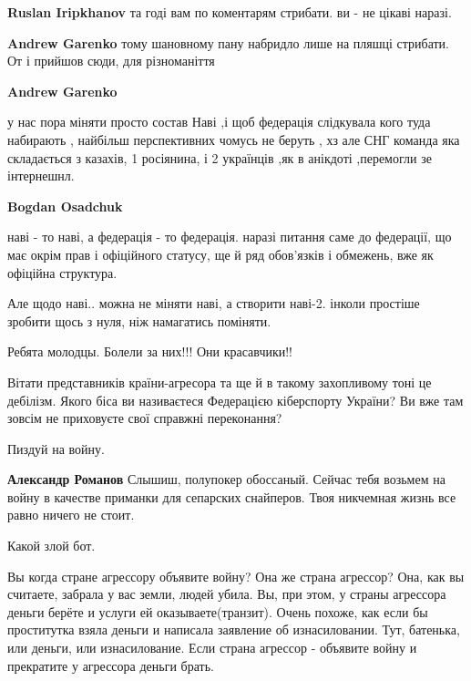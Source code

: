 \begin{itemize}
\begin{itemize}
\begin{itemize} %
\textbf{Ruslan Iripkhanov} та годі вам по коментарям стрибати. ви - не цікаві наразі.

\textbf{Andrew Garenko} тому шановному пану набридло лише на пляшці стрибати. От і прийшов сюди, для різноманіття
\end{itemize} %

\textbf{Andrew Garenko}

у нас пора міняти просто состав Наві ,і щоб федерація слідкувала кого туда
набирають , найбільш перспективних чомусь не беруть , хз але СНГ команда яка
складається з казахів, 1 росіянина, і 2 українців ,як в анікдоті ,перемогли зе
інтернешнл.

\begin{itemize} %
\textbf{Bogdan Osadchuk} 

наві - то наві, а федерація - то федерація. наразі питання саме до федерації,
що має окрім прав і офіційного статусу, ще й ряд обов'язків і обмежень, вже як
офіційна структура.

Але щодо наві.. можна не міняти наві, а створити наві-2. інколи простіше
зробити щось з нуля, ніж намагатись поміняти.

\end{itemize} %

\end{itemize} %

Ребята молодцы. Болели за них!!! Они красавчики!!


Вітати представників країни-агресора та ще й в такому захопливому тоні це
дебілізм. Якого біса ви називаєтеся Федерацією кіберспорту України? Ви вже там
зовсім не приховуєте свої справжні переконання?

\begin{itemize} %
Пиздуй на войну.

\textbf{Александр Романов} Слышиш, полупокер обоссаный. Сейчас тебя возьмем на войну в качестве приманки для сепарских снайперов. Твоя никчемная жизнь все равно ничего не стоит.
\end{itemize} %

Какой злой бот.


Вы когда стране агрессору объявите войну? Она же страна агрессор? Она, как вы
считаете, забрала у вас земли, людей убила. Вы, при этом, у страны агрессора
деньги берёте и услуги ей оказываете(транзит). Очень похоже, как если бы
проститутка взяла деньги и написала заявление об изнасиловании. Тут, батенька,
или деньги, или изнасилование. Если страна агрессор - объявите войну и
прекратите у агрессора деньги брать.


\end{itemize}

